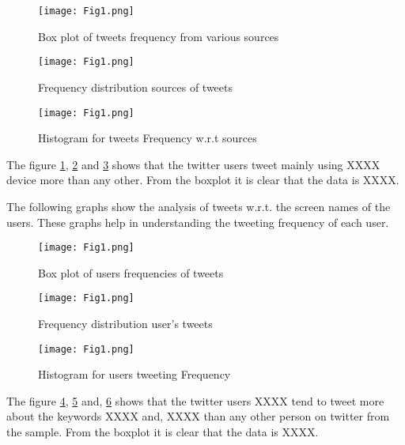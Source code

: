 \documentclass[a4paper,12pt, notitlepage]{article}
\begin{document}
\begin{figure}[!htbp]
    \centering
    \texttt{[image: Fig1.png]}
    \caption{Box plot of tweets frequency from various sources}
    \label{fig:boxplot2}
\end{figure}

\begin{figure}[!htbp]
    \centering
    \texttt{[image: Fig1.png]}
    \caption{Frequency distribution sources of tweets}
    \label{fig:vbarplot3}
\end{figure}

\begin{figure}[!htbp]
    \centering
    \texttt{[image: Fig1.png]}
    \caption{Histogram for tweets Frequency w.r.t sources}
    \label{fig:hist3}
\end{figure}

\par
The figure \ref{fig:boxplot2}, \ref{fig:vbarplot3} and \ref{fig:hist3} shows that the twitter users tweet mainly using XXXX device more than any other. From the boxplot it is clear that the data is XXXX.

\par
The following graphs show the analysis of tweets w.r.t. the screen names of the users. These graphs help in understanding the tweeting frequency of each user.

\begin{figure}[!htbp]
    \centering
    \texttt{[image: Fig1.png]}
    \caption{Box plot of users frequencies of tweets}
    \label{fig:boxplot3}
\end{figure}

\begin{figure}[!htbp]
    \centering
    \texttt{[image: Fig1.png]}
    \caption{Frequency distribution user's tweets}
    \label{fig:vbarplot4}
\end{figure}

\begin{figure}[!htbp]
    \centering
    \texttt{[image: Fig1.png]}
    \caption{Histogram for users tweeting Frequency}
    \label{fig:hist4}
\end{figure}

\par
The figure \ref{fig:boxplot3}, \ref{fig:vbarplot4} and, \ref{fig:hist4} shows that the twitter users XXXX tend to tweet more about the keywords XXXX and, XXXX than any other person on twitter from the sample. From the boxplot it is clear that the data is XXXX.
\end{document}

